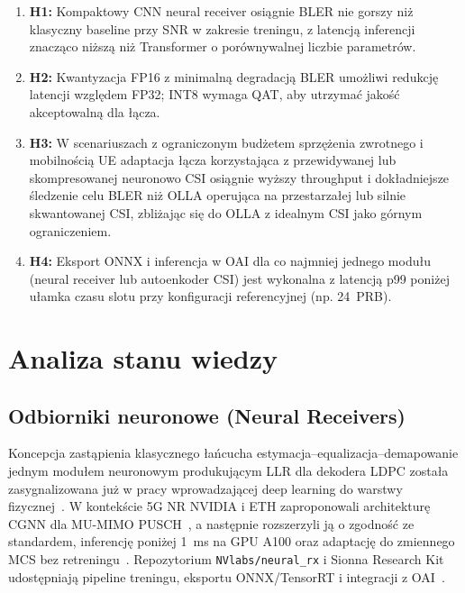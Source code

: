 \documentclass[12pt, a4paper]{article}
\begin{document}
\begin{enumerate}[label=\textbf{H\arabic*:}, leftmargin=*]
    \item \textbf{H1:} Kompaktowy CNN neural receiver osiągnie BLER nie gorszy niż klasyczny baseline przy SNR w zakresie treningu, z latencją inferencji znacząco niższą niż Transformer o porównywalnej liczbie parametrów.
    \item \textbf{H2:} Kwantyzacja FP16 z minimalną degradacją BLER umożliwi redukcję latencji względem FP32; INT8 wymaga QAT, aby utrzymać jakość akceptowalną dla łącza.
    \item \textbf{H3:} W scenariuszach z ograniczonym budżetem sprzężenia zwrotnego i mobilnością UE adaptacja łącza korzystająca z przewidywanej lub skompresowanej neuronowo CSI osiągnie wyższy throughput i dokładniejsze śledzenie celu BLER niż OLLA operująca na przestarzałej lub silnie skwantowanej CSI, zbliżając się do OLLA z idealnym CSI jako górnym ograniczeniem.
    \item \textbf{H4:} Eksport ONNX i inferencja w OAI dla co najmniej jednego modułu (neural receiver lub autoenkoder CSI) jest wykonalna z latencją p99 poniżej ułamka czasu slotu przy konfiguracji referencyjnej (np. 24~PRB).
\end{enumerate}

\section{Analiza stanu wiedzy}

\subsection{Odbiorniki neuronowe (Neural Receivers)}

Koncepcja zastąpienia klasycznego łańcucha estymacja--equalizacja--demapowanie jednym modułem neuronowym produkującym LLR dla dekodera LDPC została zasygnalizowana już w pracy wprowadzającej deep learning do warstwy fizycznej~\cite{oshea-hoydis-2017}. W kontekście 5G NR NVIDIA i ETH zaproponowali architekturę CGNN dla MU-MIMO PUSCH~\cite{arxiv-2312-02601}, a następnie rozszerzyli ją o zgodność ze standardem, inferencję poniżej 1~ms na GPU A100 oraz adaptację do zmiennego MCS bez retreningu~\cite{arxiv-2409-02912}. Repozytorium \texttt{NVlabs/neural\_rx} i Sionna Research Kit udostępniają pipeline treningu, eksportu ONNX/TensorRT i integracji z OAI~\cite{neural-rx-repo,sionna-rk}.
\end{document}
